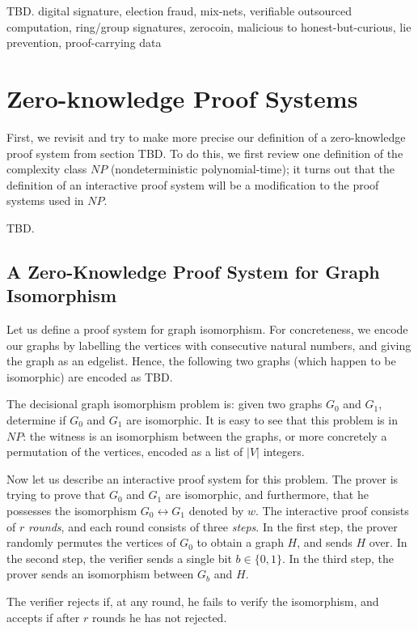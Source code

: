 \documentclass{article}
\begin{document}
TBD. digital signature, election fraud, mix-nets, verifiable outsourced computation, ring/group signatures, zerocoin, malicious to honest-but-curious, lie prevention, proof-carrying data

\section*{Zero-knowledge Proof Systems }

First, we revisit and try to make more precise our definition of a zero-knowledge proof system from section TBD. To do this, we first review one definition of the complexity class $NP$ (nondeterministic polynomial-time); it turns out that the definition of an interactive proof system will be a modification to the proof systems used in $NP$.

TBD.

\subsection*{A Zero-Knowledge Proof System for Graph Isomorphism}

Let us define a proof system for graph isomorphism. For concreteness, we encode our graphs by labelling the vertices with consecutive natural numbers, and giving the graph as an edgelist. Hence, the following two graphs (which happen to be isomorphic) are encoded as TBD.

The decisional graph isomorphism problem is: given two graphs $G_0$ and $G_1$, determine if $G_0$ and $G_1$ are isomorphic. It is easy to see that this problem is in $NP$: the witness is an isomorphism between the graphs, or more concretely a permutation of the vertices, encoded as a list of $|V|$ integers.

Now let us describe an interactive proof system for this problem. The prover is trying to prove that $G_0$ and $G_1$ are isomorphic, and furthermore, that he possesses the isomorphism $G_0 \leftrightarrow G_1$ denoted by $w$. The interactive proof consists of $r$ \textit{rounds}, and each round consists of three \textit{steps}. In the first step, the prover randomly permutes the vertices of $G_0$ to obtain a graph $H$, and sends $H$ over. In the second step, the verifier sends a single bit $b \in \{0, 1\}$. In the third step, the prover sends an isomorphism between $G_b$ and $H$.

The verifier rejects if, at any round, he fails to verify the isomorphism, and accepts if after $r$ rounds he has not rejected.
\end{document}
